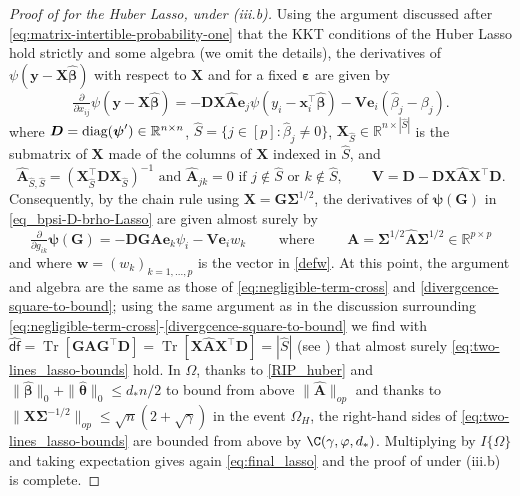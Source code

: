 \documentclass[11pt]{amsart}
\numberwithin{equation}{section}
\numberwithin{equation}{section}
\def\real{{\mathbb{R}}}
\def\R{{\real}}
\def\diag{\hbox{\rm diag}}
\DeclareMathOperator{\trace}{Tr}
\def\mathbold{\boldsymbol} %
\def\bA{\mathbold{A}}\def\calA{{\cal A}}\def\scrA{{\mathscr A}}\def\Ahat{\widehat{A}}\def\Atil{{\widetilde A}}
\def\hbA{{\widehat{\bA}}}\def\tbA{{\widetilde{\bA}}}
\def\bD{\mathbold{D}}\def\calD{{\cal D}}\def\scrD{{\mathscr D}}\def\Dhat{\widehat{D}}\def\Dtil{{\widetilde D}}
\def\bG{\mathbold{G}}\def\calG{{\cal G}}\def\scrG{{\mathscr G}}\def\Ghat{\widehat{G}}\def\Gtil{{\widetilde G}}
\def\be{\mathbold{e}}
\def\bV{\mathbold{V}}\def\hbV{{\widehat{\bV}}}\def\tbV{{\widetilde{\bV}}}
\def\bw{\mathbold{w}}\def\what{\widehat{w}}\def\wtil{\widetilde{w}}\def\wbar{{\overline w}}
\def\bx{\mathbold{x}}\def\xhat{\widehat{x}}\def\xtil{\widetilde{x}}\def\xbar{{\overline x}}\def\vbx{{\bf x}}
\def\bX{\mathbold{X}}\def\hbX{{\widehat{\bX}}}\def\tbX{{\widetilde{\bX}}}\def\bXbar{{\overline \bX}}
\def\by{\mathbold{y}}\def\yhat{\widehat{y}}\def\ytil{\widetilde{y}}\def\ybar{{\overline y}}\def\vby{{\bf y}}
\def\bbeta{\mathbold{\beta}}\def\betahat{\widehat{\beta}}\def\hbeta{\widehat{\beta}}
\def\hbbeta{{{\widehat{\bbeta}}}}
\def\ep{\varepsilon}\def\eps{\epsilon}\def\veps{\varepsilon}
\def\bep{ {\mathbold{\ep} }}
\def\btheta{\mathbold{\theta}}\def\thetahat{\widehat{\theta}}\def\htheta{\widehat{\theta}}
\def\hbtheta{{\widehat{\btheta}}}\def\tbtheta{{\widetilde{\btheta}}}
\def\bSigma{\mathbold{\Sigma}}\def\hbSigma{{\widehat{\bSigma}}}
\def\bpsi{\mathbold{\psi}}\def\psihat{\widehat{\psi}}\def\hpsi{\widehat{\psi}}
\def\calD{{\cal D}}
\def\calG{{\cal G}}
\def\df{{\hat{\mathsf{df}}}{}}
\begin{document}
\begin{proof}[Proof of 
    for the Huber Lasso, under (iii.b)]
Using the argument discussed after
\eqref{eq:matrix-intertible-probability-one} that the KKT conditions
of the Huber Lasso hold strictly and some algebra (we omit the details),
the derivatives of $\psi(\by-\bX\hbbeta)$ with respect to $\bX$ and 
for a fixed $\bep$ are given by
$$
\tfrac{\partial}{\partial x_{ij}}\psi(\by-\bX\hbbeta)
= - \bD\bX\hbA\be_j\psi(y_i-\bx_i^\top\hbbeta) - \bV\be_i (\hbeta_j-\beta_j).
$$
where $\bD=\diag(\bpsi')\in\R^{n\times n}$,
$\hat S = \{j\in[p]: \hbeta_j\ne 0\}$,
$\bX_{\hat S}\in\R^{n\times |\hat S|}$
is the submatrix of $\bX$ made of the columns of $\bX$ indexed in $\hat S$,
and
\begin{equation}
\hbA_{\hat S,\hat S} = (\bX_{\hat S}^\top \bD \bX_{\hat S})^{-1}
\text{ and }
\hbA_{jk} = 0 \text{ if }j\notin \hat S \text{ or } k\notin \hat S,
\qquad
\bV = \bD - \bD\bX\hbA\bX^\top\bD
.
\end{equation}
Consequently, by the chain rule using $\bX=\bG\bSigma^{1/2}$, the derivatives of $\bpsi(\bG)$ in \eqref{eq_bpsi-D-brho-Lasso}
are given almost surely by
\begin{equation}
    \tfrac{\partial}{\partial g_{ik}}\bpsi(\bG) 
    =
    - \bD\bG \bA \be_k \psi_i - \bV \be_i w_k
    \qquad \text{ where } \qquad
    \bA = \bSigma^{1/2}\hbA \bSigma^{1/2}\in\R^{p\times p}
\end{equation}
and where $\bw=(w_k)_{k=1,...,p}$ is the vector in \eqref{defw}.
At this point, the argument and algebra are the same as those of
\eqref{eq:negligible-term-cross}
and \eqref{divergcence-square-to-bound}; using the same argument as
in the discussion surrounding \eqref{eq:negligible-term-cross}-\eqref{divergcence-square-to-bound} we find
with 
$\df=\trace[\bG\bA\bG^\top\bD]=\trace[\bX\hbA\bX^\top\bD]=|\hat S|$
(see ) that almost surely
\eqref{eq:two-lines_lasso-bounds} hold.
In $\Omega$, thanks to \eqref{RIP_huber} and $\|\hbbeta\|_0+\|\hbtheta\|_0\le d_*n/2$
to bound from above $\|\hbA\|_{op}$ and thanks to
$\|\bX\bSigma^{-1/2}\|_{op}\le\sqrt n (2+\sqrt \gamma)$
in the event $\Omega_H$,
the right-hand sides of \eqref{eq:two-lines_lasso-bounds}
are bounded from above by $\C(\gamma,\varphi,d_*)$.
Multiplying by $I\{\Omega\}$ and taking expectation gives
again \eqref{eq:final_lasso} and the proof
of  under (iii.b) is complete.
\end{proof}
\end{document}
